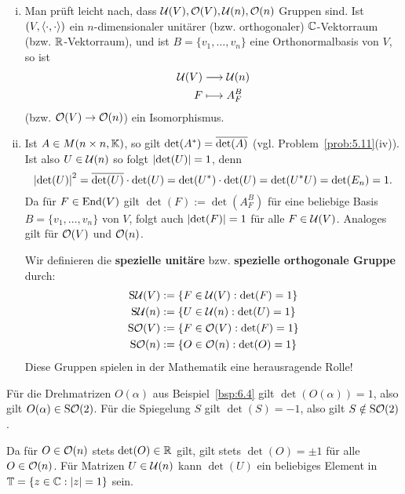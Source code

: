 \begin{bemerkung}
	\begin{enumerate}[(i)]
		\item Man prüft leicht nach, dass $\mathcal{U}(V), \mathcal{O}(V), \mathcal{U}(n), \mathcal{O}(n)$ Gruppen sind.
		Ist $(V,\left\langle\cdot,\cdot\right\rangle)$ ein $n$-dimensionaler unitärer (bzw. orthogonaler) $\mathbb{C}$-Vektorraum (bzw. $\mathbb{R}$-Vektorraum), und ist $B = \{v_1,\dots,v_n\}$ eine Orthonormalbasis von $V$, so ist
		\begin{align*}
			\mathcal{U}(V) &\longrightarrow \mathcal{U}(n) \\
			F &\longmapsto A_F^B
		\end{align*}
		(bzw. $\mathcal{O}(V) \rightarrow \mathcal{O}(n)$) ein Isomorphismus.
		\item Ist $A \in M(n \times n,\mathbb{K})$, so gilt $\det(A^*) = \overline{\det(A)}$ (vgl. Problem~\ref{prob:5.11}(iv)).
		Ist also $U \in \mathcal{U}(n)$ so folgt $\left\lvert\det(U)\right\rvert = 1$, denn
		\[
			\left\lvert\det(U)\right\rvert^2 = \overline{\det(U)} \cdot \det(U) = \det(U^*) \cdot \det(U) = \det(U^*U) = \det(E_n) = 1.
		\]
		Da für $F \in \operatorname{End}(V)$ gilt $\det(F) := \det(A_F^B)$ für eine beliebige Basis $B = \{v_1,\dots,v_n\}$ von $V$, folgt auch $\left\lvert\det(F)\right\rvert=1$ für alle $F \in \mathcal{U}(V)$.
		Analoges gilt für $\mathcal{O}(V)$ und $\mathcal{O}(n)$.
		 
		Wir definieren die \textbf{spezielle unitäre} bzw. \textbf{spezielle orthogonale Gruppe} durch:  
		\begin{align*}
			\operatorname{S\mathcal{U}}(V) &:= \{F \in \mathcal{U}(V) : \det(F) = 1\} \\
			\operatorname{S\mathcal{U}}(n) &:= \{U \in \mathcal{U}(n) : \det(U) = 1\} \\
			\operatorname{S\mathcal{O}}(V) &:= \{F \in \mathcal{O}(V) : \det(F) = 1\} \\
			\operatorname{S\mathcal{O}}(n) &:= \{O \in \mathcal{O}(n) : \det(O) = 1\} 
		\end{align*}
		Diese Gruppen spielen in der Mathematik eine herausragende Rolle!
	\end{enumerate}
\end{bemerkung}

\begin{beispiel}
	\label{bsp:6.7}
	Für die Drehmatrizen $O(\alpha)$ aus Beispiel~\ref{bsp:6.4} gilt $\det(O(\alpha)) = 1$, also gilt $O(\alpha) \in \operatorname{S\mathcal{O}}(2)$.
	Für die Spiegelung $S$ gilt $\det(S) = -1$, also gilt $S \notin \operatorname{S\mathcal{O}}(2)$.
	
	Da für $O \in \mathcal{O}(n)$ stets $\det(O) \in \mathbb{R}$ gilt, gilt stets $\det(O) = \pm 1$ für alle $O \in \mathcal{O}(n)$.
	Für Matrizen $U \in \mathcal{U}(n)$ kann $\det(U)$ ein beliebiges Element in $\mathbb{T} = \{z \in \mathbb{C}: \left\lvert z\right\rvert=1\}$ sein.
\end{beispiel}

